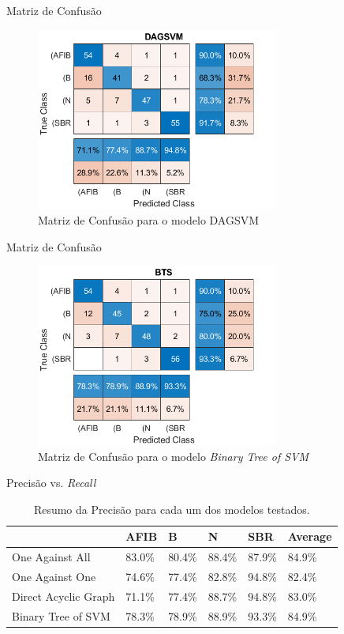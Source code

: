 \documentclass[10pt]{beamer}
\begin{document}
\begin{frame}{Matriz de Confusão}
  \begin{figure}[]
    \centering
    \includegraphics[width=8cm]{images/DAGSVMConfusion.png}
    \caption{Matriz de Confusão para o modelo DAGSVM}
  \end{figure}
\end{frame}

\begin{frame}{Matriz de Confusão}
  \begin{figure}[]
    \centering
    \includegraphics[width=8cm]{images/BTSConfusion.png}
    \caption{Matriz de Confusão para o modelo \textit{Binary Tree of SVM}}
  \end{figure}
\end{frame}

\begin{frame}{Precisão vs. \textit{Recall} }
  \begin{table}
    \centering
    \begin{tabular}{@{}llllll@{}}
      \toprule
      & AFIB   & B      & N      & SBR    & Average \\ \midrule
      One Against All      & 83.0\% & 80.4\% & 88.4\% & 87.9\% & 84.9\%  \\
      One Against One      & 74.6\% & 77.4\% & 82.8\% & 94.8\% & 82.4\%  \\
      Direct Acyclic Graph & 71.1\% & 77.4\% & 88.7\% & 94.8\% & 83.0\%  \\
      Binary Tree of SVM   & 78.3\% & 78.9\% & 88.9\% & 93.3\% & 84.9\%  \\ \bottomrule
    \end{tabular}
    \caption{Resumo da Precisão para cada um dos modelos testados.}
\end{table}

\end{frame}
\end{document}
